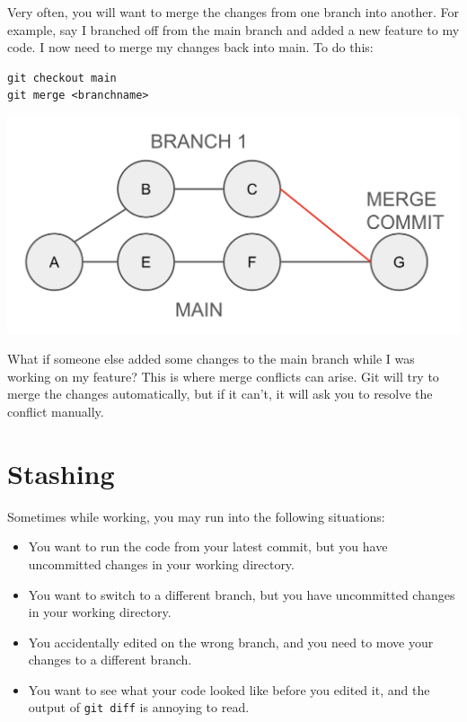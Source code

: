 \documentclass[fleqn]{article}
\begin{document}
Very often, you will want to merge the changes from one branch into another. 
For example, say I branched off from the main branch and added a new feature 
to my code. I now need to merge my changes back into main. To do this:

\begin{lstlisting}
git checkout main
git merge <branchname>
\end{lstlisting}

\begin{center}
    \includegraphics[scale=0.3]{merge.png}
\end{center}

What if someone else added some changes to the main branch while I was working
on my feature? This is where merge conflicts can arise. Git will try to merge
the changes automatically, but if it can't, it will ask you to resolve the
conflict manually.

\pagebreak

\section*{Stashing}

Sometimes while working, you may run into the following situations:
\begin{itemize}
    \item You want to run the code from your latest commit, but you have
          uncommitted changes in your working directory.
    \item You want to switch to a different branch, but you have uncommitted
          changes in your working directory.
    \item You accidentally edited on the wrong branch, and you need to move your
          changes to a different branch.
    \item You want to see what your code looked like before you edited it, and
          the output of \texttt{git diff} is annoying to read.
\end{itemize}
\end{document}
